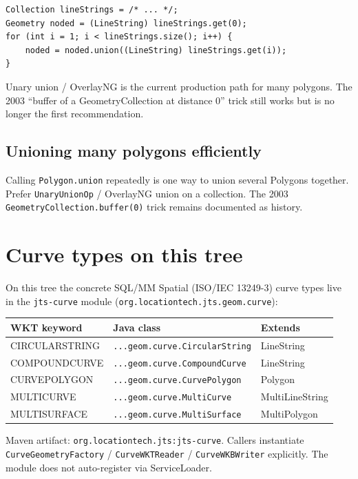 \documentclass[11pt]{article}
\begin{document}
\begin{lstlisting}
Collection lineStrings = /* ... */;
Geometry noded = (LineString) lineStrings.get(0);
for (int i = 1; i < lineStrings.size(); i++) {
    noded = noded.union((LineString) lineStrings.get(i));
}
\end{lstlisting}

Unary union / OverlayNG is the current production path for many
polygons. The 2003 ``buffer of a GeometryCollection at distance 0''
trick still works but is no longer the first recommendation.

\subsection{Unioning many polygons efficiently}
Calling \texttt{Polygon.union} repeatedly is one way to union several
Polygons together. Prefer \texttt{UnaryUnionOp} / OverlayNG union on
a collection. The 2003 \texttt{GeometryCollection.buffer(0)} trick
remains documented as history.

\section{Curve types on this tree}
\label{sec:curves}
On this tree the concrete SQL/MM Spatial (ISO/IEC 13249-3) curve
types live in the
\texttt{jts-curve} module
(\texttt{org.locationtech.jts.geom.curve}):

\begin{center}
\begin{tabular}{lll}
  \toprule
  \textbf{WKT keyword} & \textbf{Java class} & \textbf{Extends} \\
  \midrule
  CIRCULARSTRING & \texttt{...geom.curve.CircularString} & LineString \\
  COMPOUNDCURVE  & \texttt{...geom.curve.CompoundCurve}  & LineString \\
  CURVEPOLYGON   & \texttt{...geom.curve.CurvePolygon}   & Polygon \\
  MULTICURVE     & \texttt{...geom.curve.MultiCurve}     & MultiLineString \\
  MULTISURFACE   & \texttt{...geom.curve.MultiSurface}   & MultiPolygon \\
  \bottomrule
\end{tabular}
\end{center}

Maven artifact: \texttt{org.locationtech.jts:jts-curve}. Callers
instantiate \texttt{CurveGeometryFactory} / \texttt{CurveWKTReader} /
\texttt{CurveWKBWriter} explicitly. The module does not auto-register
via ServiceLoader.
\end{document}
